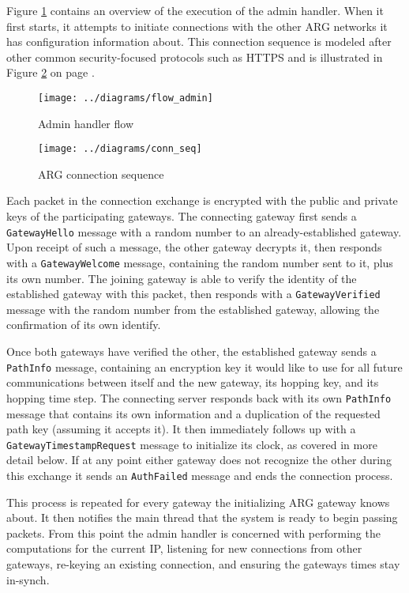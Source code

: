 \par Figure \ref{fig:flow_admin} contains an overview of the execution of the admin handler. When it first starts, it attempts to initiate connections with the other ARG networks it has configuration information about. This connection sequence is modeled after other common security-focused protocols such as HTTPS \cite{rfc2818} and is illustrated in Figure \ref{fig:conn_seq} on page \pageref{fig:conn_seq}.

\begin{figure}
	\centering
	\texttt{[image: ../diagrams/flow\_admin]}
	\caption{Admin handler flow}
	\label{fig:flow_admin}
\end{figure}

\begin{figure}
	\centering
	\texttt{[image: ../diagrams/conn\_seq]}
	\caption{ARG connection sequence}
	\label{fig:conn_seq}
\end{figure}

\par Each packet in the connection exchange is encrypted with the public and private keys of the participating gateways. The connecting gateway first sends a \texttt{GatewayHello} message with a random number to an already-established gateway. Upon receipt of such a message, the other gateway decrypts it, then responds with a \texttt{GatewayWelcome} message, containing the random number sent to it, plus its own number. The joining gateway is able to verify the identity of the established gateway with this packet, then responds with a \texttt{GatewayVerified} message with the random number from the established gateway, allowing the confirmation of its own identify.

\par Once both gateways have verified the other, the established gateway sends a \texttt{PathInfo} message, containing an encryption key it would like to use for all future communications between itself and the new gateway, its hopping key, and its hopping time step. The connecting server responds back with its own \texttt{PathInfo} message that contains its own information and a duplication of the requested path key (assuming it accepts it). It then immediately follows up with a \texttt{GatewayTimestampRequest} message to initialize its clock, as covered in more detail below. If at any point either gateway does not recognize the other during this exchange it sends an \texttt{AuthFailed} message and ends the connection process.

\par This process is repeated for every gateway the initializing ARG gateway knows about. It then notifies the main thread that the system is ready to begin passing packets. From this point the admin handler is concerned with performing the computations for the current IP, listening for new connections from other gateways, re-keying an existing connection, and ensuring the gateways times stay in-synch. %

